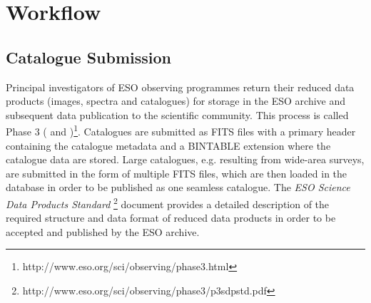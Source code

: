 \section{Workflow}
\subsection{Catalogue Submission}
Principal investigators of ESO observing programmes return their reduced data products (images, spectra and catalogues) for storage in the ESO archive and subsequent data
publication to the scientific community. This process is called Phase 3 (\citet{phase3} and \citet{messenger})\footnote{http://www.eso.org/sci/observing/phase3.html}.
Catalogues are submitted as FITS files with a primary header containing the catalogue metadata and a BINTABLE extension where the catalogue data are stored. Large catalogues, e.g.
resulting from wide-area surveys, are submitted in the form of multiple FITS files, which are then loaded in the database in order to be published as one seamless catalogue.
The \textit{ESO Science Data Products Standard} \footnote{http://www.eso.org/sci/observing/phase3/p3sdpstd.pdf}
document provides a detailed description of the required structure and data format of reduced data products in order to be accepted and published
by the ESO archive.

